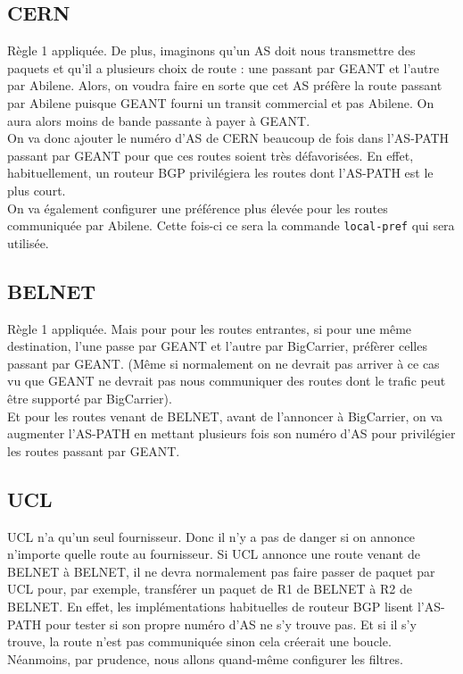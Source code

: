 \documentclass[a4paper, 12pt]{article}
\begin{document}
\subsection{CERN}
Règle 1 appliquée. De plus,
imaginons qu'un AS doit nous transmettre des paquets et qu'il a plusieurs choix de route : une passant par GEANT et l'autre par Abilene.
Alors, on voudra faire en sorte que cet AS préfère la route passant par Abilene puisque GEANT fourni un transit commercial et pas Abilene.
On aura alors moins de bande passante à payer à GEANT.
\\

On va donc ajouter le numéro d'AS de CERN beaucoup de fois dans l'AS-PATH passant par GEANT pour que ces routes soient très défavorisées.
En effet, habituellement, un routeur BGP privilégiera les routes dont l'AS-PATH est le plus court. 
\\

On va également configurer une préférence plus élevée pour les routes communiquée par Abilene.
Cette fois-ci ce sera la commande \texttt{local-pref} qui sera utilisée.

\subsection{BELNET}
Règle 1 appliquée.
Mais pour pour les routes entrantes, si pour une même destination, l'une passe par GEANT et l'autre par BigCarrier, préfèrer celles passant par GEANT.
(Même si normalement on ne devrait pas arriver à ce cas vu que GEANT ne devrait pas nous communiquer des routes dont le trafic peut être supporté par BigCarrier).
\\

Et pour les routes venant de BELNET, avant de l'annoncer à BigCarrier, on va augmenter l'AS-PATH en mettant plusieurs fois son numéro d'AS pour privilégier les routes passant par GEANT.

\subsection{UCL}
UCL n'a qu'un seul fournisseur. Donc il n'y a pas de danger si on annonce n'importe quelle route au fournisseur.
Si UCL annonce une route venant de BELNET à BELNET, il ne devra normalement pas faire passer de paquet par UCL pour, par exemple, transférer un paquet de R1 de BELNET à R2 de BELNET.
En effet, les implémentations habituelles de routeur BGP lisent l'AS-PATH pour tester si son propre numéro d'AS ne s'y trouve pas.
Et si il s'y trouve, la route n'est pas communiquée sinon cela créerait une boucle.
Néanmoins, par prudence, nous allons quand-même configurer les filtres.
\end{document}
